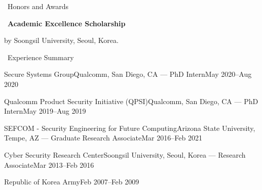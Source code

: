 \documentclass{resume} %
\begin{document}
\begin{rSection}{\faGenderless~Honors and Awards}
	\strut\textbullet~{\bf Academic Excellence Scholarship}\\
	\strut\hspace{1cm}by Soongsil University, Seoul, Korea.


	\vspace{3mm}
\end{rSection}


\begin{rSection}{\faGenderless~Experience Summary}

    \begin{rSubsection2}
        {Secure Systems Group}{Qualcomm, San Diego, CA}
        {--- PhD Intern}{May 2020--Aug 2020}
    \end{rSubsection2}
    \vspace{-3mm}

    \begin{rSubsection2}
        {Qualcomm Product Security Initiative (QPSI)}{Qualcomm, San Diego, CA}
        {--- PhD Intern}{May 2019--Aug 2019}
    \end{rSubsection2}
    \vspace{-3mm}

    \begin{rSubsection2}
		{SEFCOM - {\small Security Engineering for Future Computing}}{Arizona State University, Tempe, AZ}
		{--- Graduate Research Associate}{Mar 2016--Feb 2021}
	\end{rSubsection2}
    \vspace{-3mm}

	\begin{rSubsection2}
		{Cyber Security Research Center}{Soongsil University, Seoul, Korea}
		{--- Research Associate}{Mar 2013--Feb 2016}
	\end{rSubsection2}
	\vspace{-3mm}

	\begin{rSubsection2}
		{Republic of Korea Army}{Feb 2007--Feb 2009}
		{}{}
	\end{rSubsection2}

\vspace{3mm}
\end{rSection}
\end{document}

